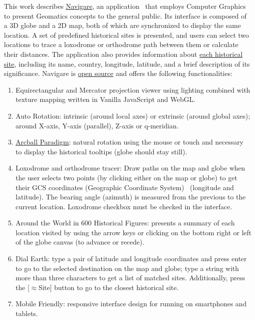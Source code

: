 \documentclass[conference]{IEEEtran}
\begin{document}
This work describes \href{https://krotalias.github.io/cwdc/13-webgl/extras/LightingWithTextureV.html}{Navigare},
an application~\cite{Navigare2026} that employs Computer Graphics to present Geomatics concepts to the general public.
Its interface is composed of a 3D globe and a 2D map, both of which are synchronized
to display the same location. A set of predefined
historical sites is presented, and users can select two locations to trace a loxodrome or orthodrome
path between them or calculate their distances.
The application also provides information about
\href{https://krotalias.github.io/cwdc/13-webgl/extras/images/Bunny.mp4}{each historical site}, including its name, country, longitude, latitude,
and a brief description of its significance.
Navigare is \href{https://choosealicense.com/pt/licenses/lgpl-3.0/}{open source} and offers the following functionalities:

\begin{enumerate}
\item Equirectangular and Mercator projection viewer using lighting combined with
    texture mapping written in Vanilla JavaScript and WebGL.

\item Auto Rotation: intrinsic (around local axes) or extrinsic (around global axes); around X-axis, Y-axis (parallel), Z-axis or q-meridian.

\item \href{https://krotalias.github.io/cwdc/13-webgl/extras/doc/ArcBallPresentation.pdf}{Arcball Paradigm}:
natural rotation using the mouse or touch and necessary to display the historical tooltips (globe should stay still).

\item Loxodrome and orthodrome tracer: Draw paths on the map and globe when the user selects two points
    (by clicking either on the map or globe) to get their GCS coordinates (Geographic Coordinate System)~\cite{IBM2026}
    (longitude and latitude).
    The bearing angle (azimuth) is measured from the previous to the current location.
    Loxodrome checkbox must be checked in the interface.

\item Around the World in 600 Historical Figures: presents a summary of each location visited by using the arrow keys
    or clicking on the bottom right or left of the globe canvas (to advance or recede).

\item Dial Earth: type a pair of latitude and longitude coordinates and press enter to go to the
    selected destination on the map and globe; type a string with more than three characters to get a list of matched sites.
    Additionally, press the [$\approx$Site] button to go to the closest historical site.

\item Mobile Friendly: responsive interface design for running on smartphones and tablets.
\end{enumerate}
\end{document}
